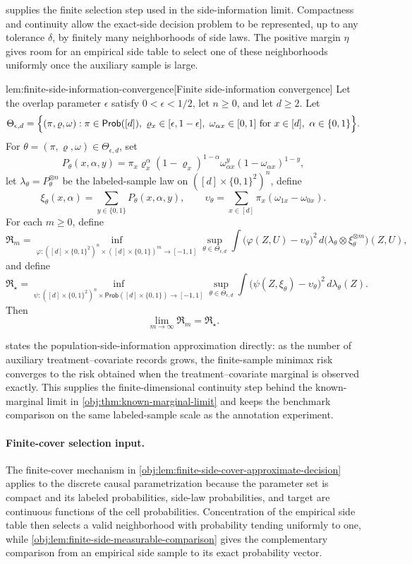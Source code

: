  supplies the finite selection step used in the side-information limit. Compactness and continuity allow the exact-side decision problem to be represented, up to any tolerance \(\delta\), by finitely many neighborhoods of side laws. The positive margin \(\eta\) gives room for an empirical side table to select one of these neighborhoods uniformly once the auxiliary sample is large.

\begin{lemmav}{lem:finite-side-information-convergence}[Finite side-information convergence]
Let the overlap parameter \(\epsilon\) satisfy \(0<\epsilon<1/2\), let \(n\ge0\), and let \(d\ge2\).  Let
\[
\Theta_{\epsilon,d}
=
\Bigl\{(\pi,\varrho,\omega):
\pi\in\mathsf{Prob}([d]),\
\varrho_x\in[\epsilon,1-\epsilon],\
\omega_{\alpha x}\in[0,1]\ \text{for }x\in[d],\ \alpha\in\{0,1\}
\Bigr\}.
\]
For \(\theta=(\pi,\varrho,\omega)\in\Theta_{\epsilon,d}\), set
\[
P_\theta(x,\alpha,y)
=
\pi_x\varrho_x^\alpha(1-\varrho_x)^{1-\alpha}
\omega_{\alpha x}^y(1-\omega_{\alpha x})^{1-y},
\]
let \(\lambda_\theta=P_\theta^{\otimes n}\) be the labeled-sample law on \(([d]\times\{0,1\}^2)^n\), define
\[
\xi_\theta(x,\alpha)=\sum_{y\in\{0,1\}}P_\theta(x,\alpha,y),
\qquad
\upsilon_\theta=\sum_{x\in[d]}\pi_x(\omega_{1x}-\omega_{0x}).
\]
For each \(m\ge0\), define
\[
\mathfrak R_m
=
\inf_{\varphi:([d]\times\{0,1\}^2)^n\times([d]\times\{0,1\})^m\to[-1,1]}
\sup_{\theta\in\Theta_{\epsilon,d}}
\int
\bigl(\varphi(Z,U)-\upsilon_\theta\bigr)^2\,
d\bigl(\lambda_\theta\otimes\xi_\theta^{\otimes m}\bigr)(Z,U),
\]
and define
\[
\mathfrak R_\star
=
\inf_{\psi:([d]\times\{0,1\}^2)^n\times\mathsf{Prob}([d]\times\{0,1\})\to[-1,1]}
\sup_{\theta\in\Theta_{\epsilon,d}}
\int
\bigl(\psi(Z,\xi_\theta)-\upsilon_\theta\bigr)^2\,
d\lambda_\theta(Z).
\]
Then
\[
\lim_{m\to\infty}\mathfrak R_m=\mathfrak R_\star .
\]
\end{lemmav}

 states the population-side-information approximation directly: as the number of auxiliary treatment--covariate records grows, the finite-sample minimax risk converges to the risk obtained when the treatment--covariate marginal is observed exactly. This supplies the finite-dimensional continuity step behind the known-marginal limit in \cref{obj:thm:known-marginal-limit} and keeps the benchmark comparison on the same labeled-sample scale as the annotation experiment.

\paragraph{Finite-cover selection input.}
The finite-cover mechanism in \cref{obj:lem:finite-side-cover-approximate-decision} applies to the discrete causal parametrization because the parameter set is compact and its labeled probabilities, side-law probabilities, and target are continuous functions of the cell probabilities. Concentration of the empirical side table then selects a valid neighborhood with probability tending uniformly to one, while \cref{obj:lem:finite-side-measurable-comparison} gives the complementary comparison from an empirical side sample to its exact probability vector.

